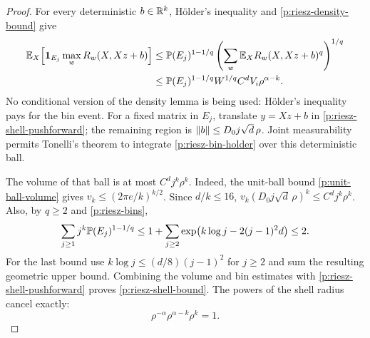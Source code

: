 \begin{proof}
For every deterministic $b\in\R^k$, H\"older's inequality and
\eqref{p:riesz-density-bound} give
\begin{equation}\label{p:riesz-bin-holder}
\begin{split}
 \E_X\!\left[\mathbf1_{E_j}\max_wR_w(X,Xz+b)\right]
 &\le \P(E_j)^{1-1/q}
       \left(\sum_w\E_X R_w(X,Xz+b)^q\right)^{1/q}\\
 &\le \P(E_j)^{1-1/q}W^{1/q}
       C^dV_i\rho^{\alpha-k}.
\end{split}
\end{equation}
No conditional version of the density lemma is being used:
H\"older's inequality pays for the bin event.  For a fixed matrix
in $E_j$, translate $y=Xz+b$ in
\eqref{p:riesz-shell-pushforward}; the remaining region is
$\norm b\le D_0j\sqrt d\,\rho$.  Joint measurability permits
Tonelli's theorem to integrate \eqref{p:riesz-bin-holder} over
this deterministic ball.

The volume of that ball is at most $C^d j^k\rho^k$.  Indeed, the unit-ball bound \eqref{p:unit-ball-volume} gives
$v_k\le(2\pi e/k)^{k/2}$. Since $d/k\le16$,
$v_k(D_0j\sqrt d\,\rho)^k\le C^d j^k\rho^k$.
Also, by $q\ge2$ and \eqref{p:riesz-bins},
\[
 \sum_{j\ge1}j^k\P(E_j)^{1-1/q}
 \le 1+\sum_{j\ge2}
       \exp\bigl(k\log j-2(j-1)^2d\bigr)
 \le 2 .
\]
For the last bound use
$k\log j\le(d/8)(j-1)^2$ for $j\ge2$ and sum the resulting
geometric upper bound.  Combining the volume and bin estimates
with \eqref{p:riesz-shell-pushforward} proves
\eqref{p:riesz-shell-bound}.  The powers of the shell radius
cancel exactly:
\[
 \rho^{-\alpha}\rho^{\alpha-k}\rho^k=1.
\]
\end{proof}

